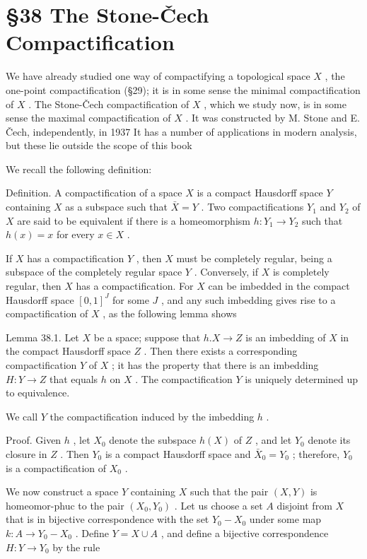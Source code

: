 \documentclass[10pt]{article}
\begin{document}
\section*{§38 The Stone-Čech Compactification}

We have already studied one way of compactifying a topological space \(X\) , the one-point compactification (§29); it is in some sense the minimal compactification of \(X\) . The Stone-Čech compactification of \(X\) , which we study now, is in some sense the maximal compactification of \(X\) . It was constructed by M. Stone and E. Čech, independently, in 1937 It has a number of applications in modern analysis, but these lie outside the scope of this book

We recall the following definition:

Definition. A compactification of a space \(X\) is a compact Hausdorff space \(Y\) containing \(X\) as a subspace such that \(\bar{X} = Y\) . Two compactifications \({Y}_{1}\) and \({Y}_{2}\) of \(X\) are said to be equivalent if there is a homeomorphism \(h : {Y}_{1} \rightarrow  {Y}_{2}\) such that \(h\left( x\right)  = x\) for every \(x \in  X\) .

If \(X\) has a compactification \(Y\) , then \(X\) must be completely regular, being a subspace of the completely regular space \(Y\) . Conversely, if \(X\) is completely regular, then \(X\) has a compactification. For \(X\) can be imbedded in the compact Hausdorff space \({\left\lbrack  0,1\right\rbrack  }^{J}\) for some \(J\) , and any such imbedding gives rise to a compactification of \(X\) , as the following lemma shows

Lemma 38.1. Let \(X\) be a space; suppose that \(h.X \rightarrow  Z\) is an imbedding of \(X\) in the compact Hausdorff space \(Z\) . Then there exists a corresponding compactification \(Y\) of \(X\) ; it has the property that there is an imbedding \(H : Y \rightarrow  Z\) that equals \(h\) on \(X\) . The compactification \(Y\) is uniquely determined up to equivalence.

We call \(Y\) the compactification induced by the imbedding \(h\) .

Proof. Given \(h\) , let \({X}_{0}\) denote the subspace \(h\left( X\right)\) of \(Z\) , and let \({Y}_{0}\) denote its closure in \(Z\) . Then \({Y}_{0}\) is a compact Hausdorff space and \({\bar{X}}_{0} = {Y}_{0}\) ; therefore, \({Y}_{0}\) is a compactification of \({X}_{0}\) .

We now construct a space \(Y\) containing \(X\) such that the pair \(\left( {X,Y}\right)\) is homeomor-phuc to the pair \(\left( {{X}_{0},{Y}_{0}}\right)\) . Let us choose a set \(A\) disjoint from \(X\) that is in bijective correspondence with the set \({Y}_{0} - {X}_{0}\) under some map \(k : A \rightarrow  {Y}_{0} - {X}_{0}\) . Define \(Y = X \cup  A\) , and define a bijective correspondence \(H : Y \rightarrow  {Y}_{0}\) by the rule
\end{document}

